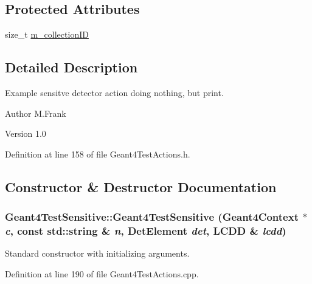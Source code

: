 \subsection*{Protected Attributes}
\begin{DoxyCompactItemize}
\item 
size\_\-t \hyperlink{class_d_d4hep_1_1_simulation_1_1_test_1_1_geant4_test_sensitive_a2b6048929e3f19fbe4e2f9eb4fe8e77a}{m\_\-collectionID}
\end{DoxyCompactItemize}


\subsection{Detailed Description}
Example sensitve detector action doing nothing, but print. \begin{DoxyAuthor}{Author}
M.Frank 
\end{DoxyAuthor}
\begin{DoxyVersion}{Version}
1.0 
\end{DoxyVersion}


Definition at line 158 of file Geant4TestActions.h.

\subsection{Constructor \& Destructor Documentation}
\hypertarget{class_d_d4hep_1_1_simulation_1_1_test_1_1_geant4_test_sensitive_ad25fb0c90df85ec1ad12ab7dc4311fcc}{
\subsubsection[{Geant4TestSensitive}]{\setlength{\rightskip}{0pt plus 5cm}Geant4TestSensitive::Geant4TestSensitive ({\bf Geant4Context} $\ast$ {\em c}, \/  const std::string \& {\em n}, \/  {\bf DetElement} {\em det}, \/  {\bf LCDD} \& {\em lcdd})}}
\label{class_d_d4hep_1_1_simulation_1_1_test_1_1_geant4_test_sensitive_ad25fb0c90df85ec1ad12ab7dc4311fcc}


Standard constructor with initializing arguments. 

Definition at line 190 of file Geant4TestActions.cpp.

